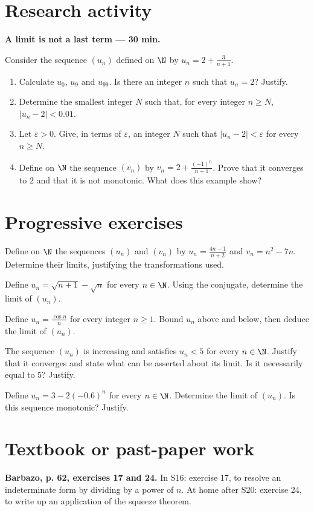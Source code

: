 \mxnewpage
\section{Research activity}\textbf{A limit is not a last term --- 30 min.}\par Consider the sequence $(u_n)$ defined on $\N$ by $u_n=2+\frac3{n+1}$.
\begin{enumerate}\item Calculate $u_0$, $u_9$ and $u_{99}$. Is there an integer $n$ such that $u_n=2$? Justify.
\item Determine the smallest integer $N$ such that, for every integer $n\ge N$, $|u_n-2|<\num{0,01}$.
\item Let $\varepsilon>0$. Give, in terms of $\varepsilon$, an integer $N$ such that $|u_n-2|<\varepsilon$ for every $n\ge N$.
\item Define on $\N$ the sequence $(v_n)$ by $v_n=2+\frac{(-1)^n}{n+1}$. Prove that it converges to $2$ and that it is not monotonic. What does this example show?\end{enumerate}

\mxnewpage
\section{Progressive exercises}

Define on $\N$ the sequences $(u_n)$ and $(v_n)$ by $u_n=\frac{4n-1}{n+2}$ and $v_n=n^2-7n$. Determine their limits, justifying the transformations used.

Define $u_n=\sqrt{n+1}-\sqrt n$ for every $n\in\N$. Using the conjugate, determine the limit of $(u_n)$.

Define $u_n=\frac{\cos n}{n}$ for every integer $n\ge1$. Bound $u_n$ above and below, then deduce the limit of $(u_n)$.

The sequence $(u_n)$ is increasing and satisfies $u_n<5$ for every $n\in\N$. Justify that it converges and state what can be asserted about its limit. Is it necessarily equal to $5$? Justify.

Define $u_n=3-2(-\num{0,6})^n$ for every $n\in\N$. Determine the limit of $(u_n)$. Is this sequence monotonic? Justify.

\section{Textbook or past-paper work}\textbf{Barbazo, p. 62, exercises 17 and 24.} In S16: exercise 17, to resolve an indeterminate form by dividing by a power of $n$. At home after S20: exercise 24, to write up an application of the squeeze theorem.

